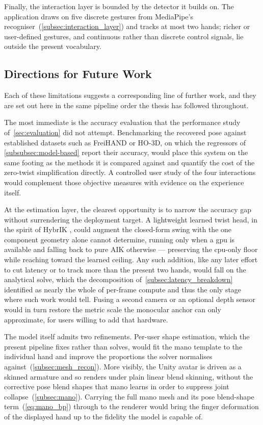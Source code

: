 Finally, the interaction layer is bounded by the detector it builds on. The application
draws on five discrete gestures from MediaPipe's recogniser~(\autoref{subsec:interaction_layer})
and tracks at most two hands; richer or user-defined gestures, and continuous rather
than discrete control signals, lie outside the present vocabulary.

\subsection{Directions for Future Work}\label{subsec:conclusion_future}

Each of these limitations suggests a corresponding line of further work, and they are
set out here in the same pipeline order the thesis has followed throughout.

The most immediate is the accuracy evaluation that the performance study
of~\autoref{sec:evaluation} did not attempt. Benchmarking
the recovered pose against established datasets such as FreiHAND or HO-3D, on which the
regressors of \autoref{subsubsec:model-based} report their accuracy, would place this
system on the same footing as the methods it is compared against and quantify the cost
of the zero-twist simplification directly. A controlled user study of the four
interactions would complement those objective measures with evidence on the experience
itself.

At the estimation layer, the clearest opportunity is to narrow the accuracy gap without
surrendering the deployment target. A lightweight learned twist head, in the spirit of
HybrIK \cite{li2022hybrik}, could augment the closed-form swing with the one component
geometry alone cannot determine, running only when a \acrshort{gpu} is available and
falling back to pure AIK otherwise --- preserving the \acrshort{cpu}-only floor while
reaching toward the learned ceiling. Any such addition, like any later effort to cut
latency or to track more than the present two hands, would fall on the analytical solve,
which the decomposition of~\autoref{subsec:latency_breakdown} identified as nearly the
whole of per-frame compute and thus the only stage where such work would tell.
Fusing a second camera or an optional depth sensor
would in turn restore the metric scale the monocular anchor can only approximate, for
users willing to add that hardware.

The model itself admits two refinements. Per-user shape estimation, which the present
pipeline fixes rather than solves, would fit the \acrshort{mano} template to the
individual hand and improve the proportions the solver normalises
against~(\autoref{subsec:mesh_recon}). More visibly, the Unity avatar is driven as a
skinned armature and so renders under plain linear blend skinning, without the
corrective pose blend shapes that \acrshort{mano} learns in order to suppress joint
collapse~(\autoref{subsec:mano}). Carrying the full \acrshort{mano} mesh and its pose
blend-shape term~(\autoref{eq:mano_bp}) through to the renderer would bring the finger
deformation of the displayed hand up to the fidelity the model is capable of.

